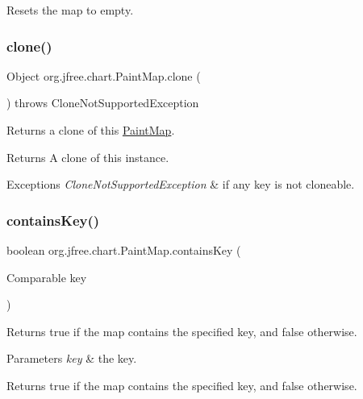 Resets the map to empty. \mbox{\label{classorg_1_1jfree_1_1chart_1_1_paint_map_ab200a8d2cad8dfb435483cbfeb3929e3}} 
\subsubsection{\texorpdfstring{clone()}{clone()}}
{\footnotesize\ttfamily Object org.\+jfree.\+chart.\+Paint\+Map.\+clone (\begin{DoxyParamCaption}{ }\end{DoxyParamCaption}) throws Clone\+Not\+Supported\+Exception}

Returns a clone of this {\ttfamily \mbox{\hyperlink{classorg_1_1jfree_1_1chart_1_1_paint_map}{Paint\+Map}}}.

\begin{DoxyReturn}{Returns}
A clone of this instance.
\end{DoxyReturn}

\begin{DoxyExceptions}{Exceptions}
{\em Clone\+Not\+Supported\+Exception} & if any key is not cloneable. \\
\hline
\end{DoxyExceptions}
\mbox{\label{classorg_1_1jfree_1_1chart_1_1_paint_map_a515547bfe3ec967cddac165a01d60a7f}} 
\subsubsection{\texorpdfstring{contains\+Key()}{containsKey()}}
{\footnotesize\ttfamily boolean org.\+jfree.\+chart.\+Paint\+Map.\+contains\+Key (\begin{DoxyParamCaption}\item[{Comparable}]{key }\end{DoxyParamCaption})}

Returns {\ttfamily true} if the map contains the specified key, and {\ttfamily false} otherwise.


\begin{DoxyParams}{Parameters}
{\em key} & the key.\\
\hline
\end{DoxyParams}
\begin{DoxyReturn}{Returns}
{\ttfamily true} if the map contains the specified key, and {\ttfamily false} otherwise. 
\end{DoxyReturn}
\mbox{\label{classorg_1_1jfree_1_1chart_1_1_paint_map_afa33e31ef63bb7e178521c3903e5230f}} 
